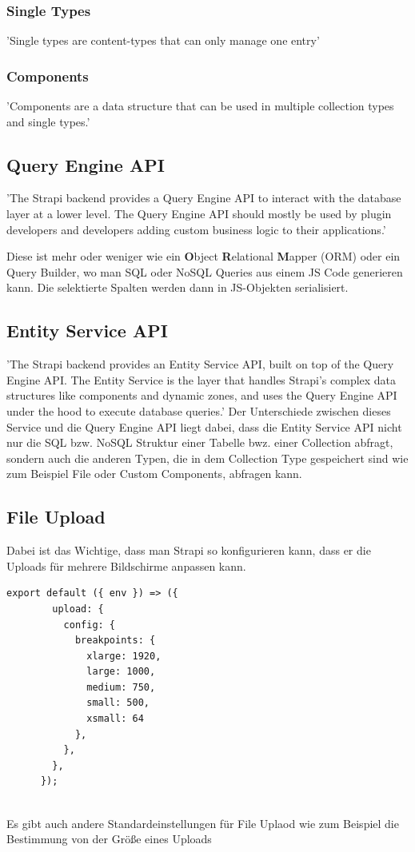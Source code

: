 \subsubsection{Single Types}
\label{single-types}
'Single types are content-types that can only manage one entry'
\cite{collection-types}

\subsubsection*{Components}
'Components are a data structure that can be used in multiple collection types and single types.'
\cite{collection-types}

\subsection{Query Engine API}
'The Strapi backend provides a Query Engine API to interact with the database layer at a lower level.
The Query Engine API should mostly be used by plugin developers and developers adding custom business logic
to their applications.'
\cite{query-engine-api}

Diese ist mehr oder weniger wie ein \textbf{O}bject \textbf{R}elational \textbf{M}apper (ORM) oder ein Query Builder, wo man SQL oder NoSQL Queries aus einem JS Code generieren kann. Die selektierte Spalten werden dann in JS-Objekten serialisiert.

\subsection{Entity Service API}
'The Strapi backend provides an Entity Service API, built on top of the Query Engine API. The Entity Service is the layer that handles Strapi's complex data structures like components and dynamic zones, and uses the Query Engine API under the hood to execute database queries.'
Der Unterschiede zwischen dieses Service und die Query Engine API liegt dabei, dass die Entity Service API nicht nur die SQL bzw. NoSQL Struktur einer Tabelle bwz. einer Collection abfragt, sondern auch die anderen Typen, die in dem Collection Type gespeichert sind wie zum Beispiel File oder Custom Components, abfragen kann.
\cite{service-engine-api}
\subsection{File Upload}

Dabei ist das Wichtige, dass man Strapi so konfigurieren kann, dass er die Uploads für mehrere Bildschirme anpassen kann.
\begin{lstlisting}[caption=file upload config in strapi]
    export default ({ env }) => ({
        upload: {
          config: {
            breakpoints: {
              xlarge: 1920,
              large: 1000,
              medium: 750,
              small: 500,
              xsmall: 64
            },
          },
        },
      });
    
\end{lstlisting}
Es gibt auch andere Standardeinstellungen für File Uplaod wie zum Beispiel die Bestimmung von der Größe eines Uploads
\cite{upload}

